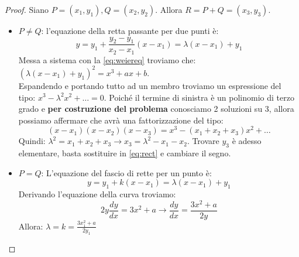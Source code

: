 \begin{proof}
Siano $P=(x_1,y_1),Q=(x_2,y_2)$. Allora $R=P+Q=(x_3,y_3)$.\\
\begin{itemize}
    \item $P\ne Q$: l'equazione della retta passante per due punti è:
    \begin{equation}\label{eq:rect}
    y=y_1+\frac{y_2-y_1}{x_2-x_1}(x-x_1)=\lambda(x-x_1)+y_1    
    \end{equation}
    Messa a sistema con la \cref{eq:weiereq} troviamo che: $(\lambda(x-x_1)+y_1)^2=x^3+ax+b$.\\
    Espandendo e portando tutto ad un membro troviamo un espressione del tipo: $x^3-\lambda^2x^2+\dots=0$.
    Poiché il termine di sinistra è un polinomio di terzo grado e \textbf{per costruzione del problema} conosciamo 2 soluzioni su 3, allora possiamo affermare che avrà una fattorizzazione del tipo: 
    \[(x-x_1)(x-x_2)(x-x_3)=x^3-(x_1+x_2+x_3)x^2+\dots
    \]
    Quindi: $\lambda^2=x_1+x_2+x_3\longrightarrow x_3=\lambda^2-x_1-x_2$. Trovare $y_3$ è adesso elementare, basta sostituire in \cref{eq:rect} e cambiare il segno.
    \item $P=Q$: L'equazione del fascio di rette per un punto è:
    \begin{equation}\label{eq:rectspan}
        y=y_1+k(x-x_1)=\lambda(x-x_1)+y_1
    \end{equation}
    Derivando l'equazione della curva troviamo:
    \[
    2y\frac{dy}{dx}=3x^2+a\longrightarrow\frac{dy}{dx}=\frac{3x^2+a}{2y}
    \]
    Allora: $\lambda=k=\frac{3x_1^2+a}{2y_1}$
\end{itemize}
\end{proof}
